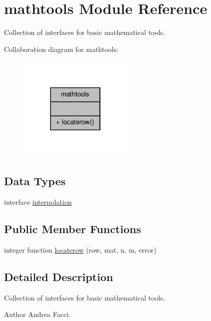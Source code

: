 \hypertarget{classmathtools}{\section{mathtools Module Reference}
\label{classmathtools}
}


Collection of interfaces for basic mathematical tools.  




Collaboration diagram for mathtools\-:\nopagebreak
\begin{figure}[H]
\begin{center}
\leavevmode
\includegraphics[width=154pt]{classmathtools__coll__graph}
\end{center}
\end{figure}
\subsection*{Data Types}
\begin{DoxyCompactItemize}
\item 
interface \hyperlink{interfacemathtools_1_1interpolation}{interpolation}
\end{DoxyCompactItemize}
\subsection*{Public Member Functions}
\begin{DoxyCompactItemize}
\item 
integer function \hyperlink{classmathtools_a64c72087c0180d1e0cfbd7356d8a1a5a}{locaterow} (row, mat, n, m, error)
\end{DoxyCompactItemize}


\subsection{Detailed Description}
Collection of interfaces for basic mathematical tools. \begin{DoxyAuthor}{Author}
Andrea Facci. 
\end{DoxyAuthor}


